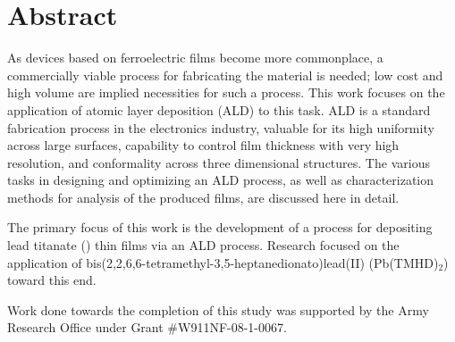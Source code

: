 \newpage
\chapter*{Abstract}


\noindent As devices based on ferroelectric films become more commonplace, a commercially viable process for fabricating the material is needed; low cost and high volume are implied necessities for such a process. This work focuses on the application of atomic layer deposition (ALD) to this task. ALD is a standard fabrication process in the electronics industry, valuable for its high uniformity across large surfaces, capability to control film thickness with very high resolution, and conformality across three dimensional structures. The various tasks in designing and optimizing an ALD process, as well as characterization methods for analysis of the produced films, are discussed here in detail.

The primary focus of this work is the development of a process for depositing lead titanate () thin films via an ALD process. Research focused on the application of bis(2,2,6,6-tetramethyl-3,5-heptanedionato)lead(II) (Pb(TMHD)$_{2}$) toward this end. 

Work done towards the completion of this study was supported by the Army Research Office under Grant \#W911NF-08-1-0067. 
